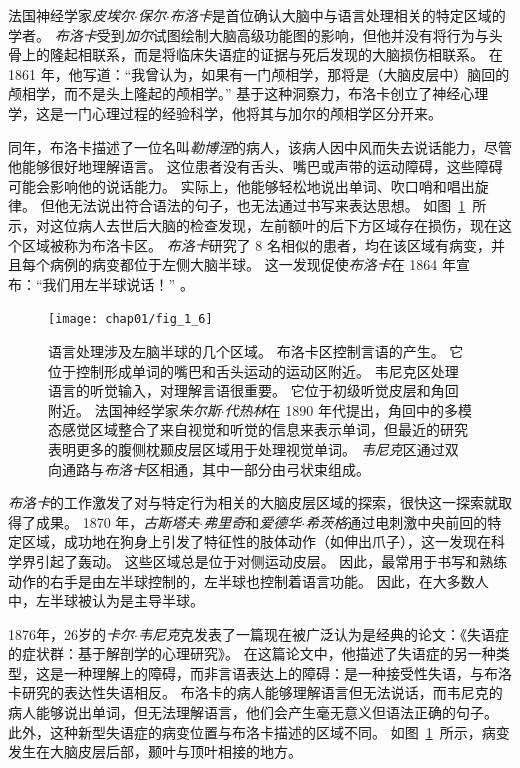 法国神经学家\textit{皮埃尔$\cdot$保尔$\cdot$布洛卡}是首位确认大脑中与语言处理相关的特定区域的学者。
\textit{布洛卡}受到\textit{加尔}试图绘制大脑高级功能图的影响，但他并没有将行为与头骨上的隆起相联系，而是将临床失语症的证据与死后发现的大脑损伤相联系。
在1861 年，他写道：“我曾认为，如果有一门颅相学，那将是（大脑皮层中）脑回的颅相学，而不是头上隆起的颅相学。” 
基于这种洞察力，布洛卡创立了神经心理学，这是一门心理过程的经验科学，他将其与加尔的颅相学区分开来。


同年，布洛卡描述了一位名叫\textit{勒博涅}的病人，该病人因中风而失去说话能力，尽管他能够很好地理解语言。
这位患者没有舌头、嘴巴或声带的运动障碍，这些障碍可能会影响他的说话能力。
实际上，他能够轻松地说出单词、吹口哨和唱出旋律。
但他无法说出符合语法的句子，也无法通过书写来表达思想。
如图~\ref{fig:1_6}~所示，对这位病人去世后大脑的检查发现，左前额叶的后下方区域存在损伤，现在这个区域被称为布洛卡区。
\textit{布洛卡}研究了 8 名相似的患者，均在该区域有病变，并且每个病例的病变都位于左侧大脑半球。
这一发现促使\textit{布洛卡}在 1864 年宣布：“我们用左半球说话！” 。


\begin{figure}[htbp]
	\centering
	\texttt{[image: chap01/fig\_1\_6]}
	\caption{语言处理涉及左脑半球的几个区域。
		布洛卡区控制言语的产生。
		它位于控制形成单词的嘴巴和舌头运动的运动区附近。
		韦尼克区处理语言的听觉输入，对理解言语很重要。
		它位于初级听觉皮层和角回附近。
		法国神经学家\textit{朱尔斯$\cdot$代热林}在 1890 年代提出，角回中的多模态感觉区域整合了来自视觉和听觉的信息来表示单词，但最近的研究表明更多的腹侧枕颞皮层区域用于处理视觉单词。
		\textit{韦尼克}区通过双向通路与\textit{布洛卡}区相通，其中一部分由弓状束组成\cite{geschwind1979specializations}。}
	\label{fig:1_6}
\end{figure}


\textit{布洛卡}的工作激发了对与特定行为相关的大脑皮层区域的探索，很快这一探索就取得了成果。
1870 年，\textit{古斯塔夫$\cdot$弗里奇}和\textit{爱德华$\cdot$希茨格}通过电刺激中央前回的特定区域，成功地在狗身上引发了特征性的肢体动作（如伸出爪子），这一发现在科学界引起了轰动。
这些区域总是位于对侧运动皮层。
因此，最常用于书写和熟练动作的右手是由左半球控制的，左半球也控制着语言功能。
因此，在大多数人中，左半球被认为是主导半球。



1876年，26岁的\textit{卡尔$\cdot$韦尼克}克发表了一篇现在被广泛认为是经典的论文：《失语症的症状群：基于解剖学的心理研究》。
在这篇论文中，他描述了失语症的另一种类型，这是一种理解上的障碍，而非言语表达上的障碍：是一种接受性失语，与布洛卡研究的表达性失语相反。
布洛卡的病人能够理解语言但无法说话，而韦尼克的病人能够说出单词，但无法理解语言，他们会产生毫无意义但语法正确的句子。
此外，这种新型失语症的病变位置与布洛卡描述的区域不同。
如图~\ref{fig:1_6}~所示，病变发生在大脑皮层后部，颞叶与顶叶相接的地方。



